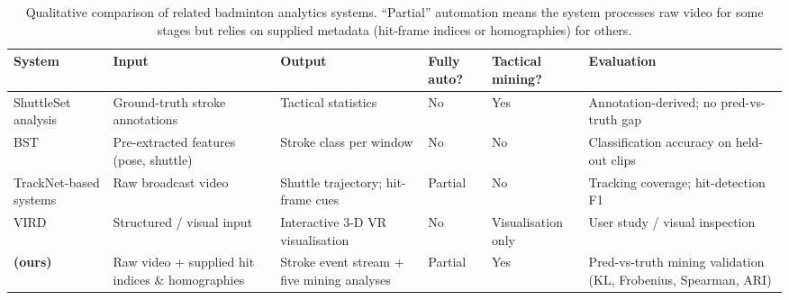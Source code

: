 \begin{table}[t]
  \caption{Qualitative comparison of related badminton analytics systems.
  ``Partial'' automation means the system processes raw video for some stages
  but relies on supplied metadata (hit-frame indices or homographies) for
  others.}
  \label{tab:comparison}
  \centering
  \small
  \setlength{\tabcolsep}{4pt}
  \renewcommand{\arraystretch}{1.15}
  \begin{tabular}{p{2.8cm} p{3.2cm} p{2.8cm} p{1.6cm} p{1.6cm} p{3.5cm}}
    \toprule
    System & Input & Output & Fully auto? & Tactical mining? & Evaluation \\
    \midrule
    ShuttleSet analysis \cite{shuttleset}
      & Ground-truth stroke annotations
      & Tactical statistics
      & No
      & Yes
      & Annotation-derived; no pred-vs-truth gap \\[3pt]

    BST \cite{chang2025bst}
      & Pre-extracted features (pose, shuttle)
      & Stroke class per window
      & No
      & No
      & Classification accuracy on held-out clips \\[3pt]

    TrackNet-based systems \cite{tracknetv2,hsu2024enhancing}
      & Raw broadcast video
      & Shuttle trajectory; hit-frame cues
      & Partial
      & No
      & Tracking coverage; hit-detection F1 \\[3pt]

    VIRD \cite{vird2023}
      & Structured / visual input
      & Interactive 3-D VR visualisation
      & No
      & Visualisation only
      & User study / visual inspection \\[3pt]

    \textbf{\method{} (ours)}
      & Raw video + supplied hit indices \& homographies
      & Stroke event stream + five mining analyses
      & Partial
      & Yes
      & Pred-vs-truth mining validation (KL, Frobenius, Spearman, ARI) \\
    \bottomrule
  \end{tabular}
\end{table}
